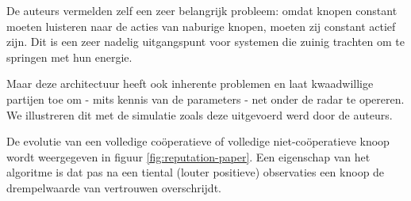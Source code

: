 De auteurs vermelden zelf een zeer belangrijk probleem: omdat knopen constant
moeten luisteren naar de acties van naburige knopen, moeten zij constant actief
zijn. Dit is een zeer nadelig uitgangspunt voor systemen die zuinig trachten om
te springen met hun energie.

Maar deze architectuur heeft ook inherente problemen en laat kwaadwillige
partijen toe om - mits kennis van de parameters - net onder de radar te
opereren. We illustreren dit met de simulatie zoals deze uitgevoerd werd door
de auteurs.

De evolutie van een volledige co\"operatieve of volledige niet-co\"operatieve
knoop wordt weergegeven in figuur \ref{fig:reputation-paper}. Een eigenschap
van het algoritme is dat pas na een tiental (louter positieve) observaties een
knoop de drempelwaarde van vertrouwen overschrijdt.

